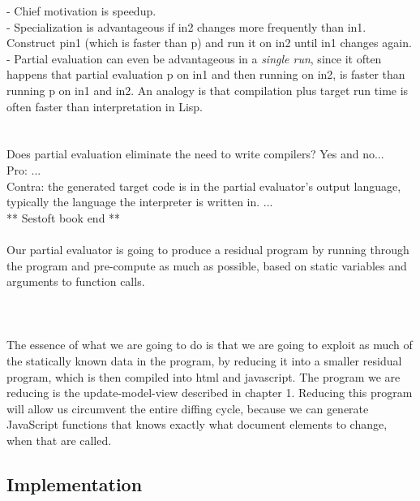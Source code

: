 - Chief motivation is speedup. \\
- Specialization is advantageous if in2 changes more frequently than in1. Construct pin1 (which is faster than p) and run it on in2 until in1 changes again.\\
- Partial evaluation can even be advantageous in a \textit{single run}, since it often happens that partial evaluation p on in1 and then running on in2, is faster than running p on in1 and in2. An analogy is that compilation plus target run time is often faster than interpretation in Lisp.\\
\\\\
Does partial evaluation eliminate the need to write compilers? Yes and no...\\
Pro: ...\\
Contra: the generated target code is in the partial evaluator's output language,
typically the language the interpreter is written in. ... \\

** Sestoft book end ** \\\\







Our partial evaluator is going to produce a residual program by running through the program and pre-compute as much as possible, based on static variables and arguments to function calls. \\\\
    
\\\\
The essence of what we are going to do is that we are going to exploit as much of the statically known data in the program, by reducing it into a smaller residual program, which is then compiled into html and javascript. The program we are reducing is the update-model-view described in chapter 1. Reducing this program will allow us circumvent the entire diffing cycle, because we can generate JavaScript functions that knows exactly what document elements to change, when that are called. 

\subsection{Implementation}

